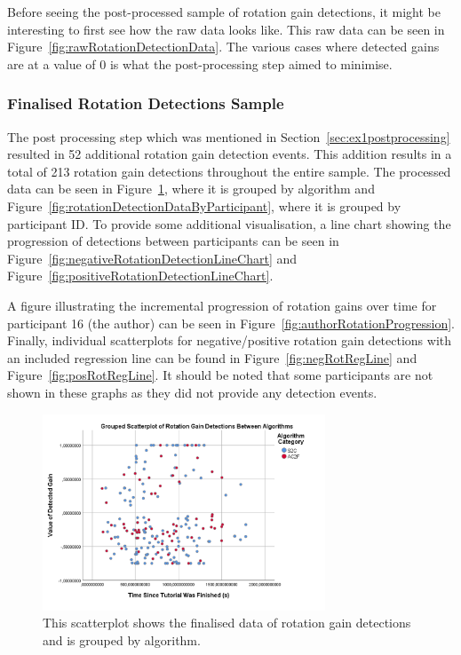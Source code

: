 Before seeing the post-processed sample of rotation gain detections, it might be interesting to first see how the raw data looks like. This raw data can be seen in Figure~\ref{fig:rawRotationDetectionData}. The various cases where detected gains are at a value of 0 is what the post-processing step aimed to minimise. 

\subsubsection{Finalised Rotation Detections Sample}
The post processing step which was mentioned in Section~\ref{sec:ex1postprocessing} resulted in 52 additional rotation gain detection events. This addition results in a total of 213 rotation gain detections throughout the entire sample. The processed data can be seen in Figure~\ref{fig:rotationDetectionDataByAlgorithm}, where it is grouped by algorithm and Figure~\ref{fig:rotationDetectionDataByParticipant}, where it is grouped by participant ID. To provide some additional visualisation, a line chart showing the progression of detections between participants can be seen in Figure~\ref{fig:negativeRotationDetectionLineChart} and Figure~\ref{fig:positiveRotationDetectionLineChart}.

 A figure illustrating the incremental progression of rotation gains over time for participant 16 (the author) can be seen in Figure~\ref{fig:authorRotationProgression}. Finally, individual scatterplots for negative/positive rotation gain detections with an included regression line can be found in Figure~\ref{fig:negRotRegLine} and Figure~\ref{fig:posRotRegLine}. It should be noted that some participants are not shown in these graphs as they did not provide any detection events. 

\begin{figure}[tbph]
    \centering
    \includegraphics[width=0.75\textwidth]{figures/graphs/ProcessedRotationDetections.png}
    \caption[Finalised Detection Scatterplot For Rotation Gains, Grouped by Algorithm]{This scatterplot shows the finalised data of rotation gain detections and is grouped by algorithm.}
    \label{fig:rotationDetectionDataByAlgorithm}
\end{figure}

